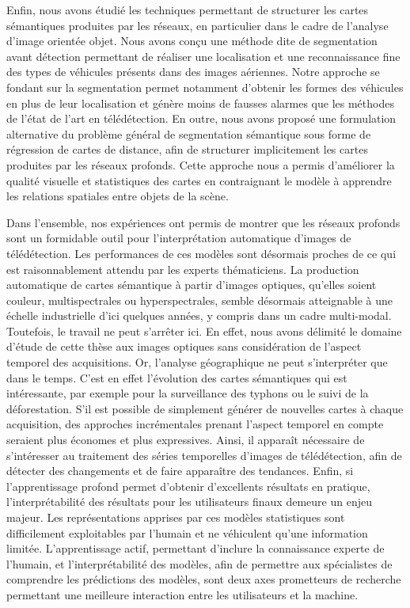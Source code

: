 Enfin, nous avons étudié les techniques permettant de structurer les cartes sémantiques produites par les réseaux, en particulier dans le cadre de l'analyse d'image orientée objet. Nous avons conçu une méthode dite de segmentation avant détection permettant de réaliser une localisation et une reconnaissance fine des types de véhicules présents dans des images aériennes. Notre approche se fondant sur la segmentation permet notamment d'obtenir les formes des véhicules en plus de leur localisation et génère moins de fausses alarmes que les méthodes de l'état de l'art en télédétection. En outre, nous avons proposé une formulation alternative du problème général de segmentation sémantique sous forme de régression de cartes de distance, afin de structurer implicitement les cartes produites par les réseaux profonds. Cette approche nous a permis d'améliorer la qualité visuelle et statistiques des cartes en contraignant le modèle à apprendre les relations spatiales entre objets de la scène.

Dans l'ensemble, nos expériences ont permis de montrer que les réseaux profonds sont un formidable outil pour l'interprétation automatique d'images de télédétection. Les performances de ces modèles sont désormais proches de ce qui est raisonnablement attendu par les experts thématiciens. La production automatique de cartes sémantique à partir d'images optiques, qu'elles soient couleur, multispectrales ou hyperspectrales, semble désormais atteignable à une échelle industrielle d'ici quelques années, y compris dans un cadre multi-modal. Toutefois, le travail ne peut s'arrêter ici. En effet, nous avons délimité le domaine d'étude de cette thèse aux images optiques sans considération  de l'aspect temporel des acquisitions. Or, l'analyse géographique ne peut s'interpréter que dans le temps. C'est en effet l'évolution des cartes sémantiques qui est intéressante, par exemple pour la surveillance des typhons ou le suivi de la déforestation. S'il est possible de simplement générer de nouvelles cartes à chaque acquisition, des approches incrémentales prenant l'aspect temporel en compte seraient plus économes et plus expressives. Ainsi, il apparaît nécessaire de s'intéresser au traitement des séries temporelles d'images de télédétection, afin de détecter des changements et de faire apparaître des tendances. Enfin, si l'apprentissage profond permet d'obtenir d'excellents résultats en pratique, l'interprétabilité des résultats pour les utilisateurs finaux demeure un enjeu majeur. Les représentations apprises par ces modèles statistiques sont difficilement exploitables par l'humain et ne véhiculent qu'une information limitée. L'apprentissage actif, permettant d'inclure la connaissance experte de l'humain, et l'interprétabilité des modèles, afin de permettre aux spécialistes de comprendre les prédictions des modèles, sont deux axes prometteurs de recherche permettant une meilleure interaction entre les utilisateurs et la machine.

